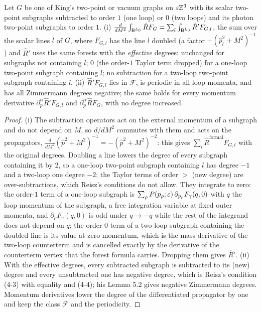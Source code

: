 \begin{lemma}\label{lem:a06:Dp}
Let $G$ be one of King's two-point or vacuum graphs on $\varepsilon\mathbb Z^3$ with its scalar two-point subgraphs subtracted to order $1$ (one loop) or $0$ (two loops) and its photon two-point subgraphs to order $1$. \textup{(i)} $\frac{d}{dM^2}\int_{\mathsf B^{L_0}}\hat RF_G=\sum_{l}\int_{\mathsf B^{L_0}}\hat R'F_{G,l}$, the sum over the scalar lines $l$ of $G$, where $F_{G,l}$ has the line $l$ doubled (a factor $-(\hat p_l^2+M^2)^{-1}$) and $\hat R'$ uses the same forests with the \emph{effective} degrees: unchanged for subgraphs not containing $l$; $0$ (the order-$1$ Taylor term dropped) for a one-loop two-point subgraph containing $l$; no subtraction for a two-loop two-point subgraph containing $l$. \textup{(ii)} $\hat R'F_{G,l}$ lies in $\mathcal F$, is periodic in all loop momenta, and has all Zimmermann degrees negative; the same holds for every momentum derivative $\partial^\alpha_p\hat R'F_{G,l}$ and $\partial^\alpha_p\hat RF_G$, with no degree increased.
\end{lemma}

\begin{proof}
(i) The subtraction operators act on the external momentum of a subgraph and do not depend on $M$, so $d/dM^2$ commutes with them and acts on the propagators, $\frac{d}{dM^2}(\hat p^2+M^2)^{-1}=-(\hat p^2+M^2)^{-2}$: this gives $\sum_l\hat R^{\mathrm{formal}}F_{G,l}$ with the original degrees. Doubling a line lowers the degree of every subgraph containing it by $2$, so a one-loop two-point subgraph containing $l$ has degree $-1$ and a two-loop one degree $-2$; the Taylor terms of order $>$ (new degree) are over-subtractions, which Reisz's conditions do not allow. They integrate to zero: the order-$1$ term of a one-loop subgraph is $\sum_\rho P(p_\rho;\varepsilon)\,\partial_{p_\rho}F_\gamma(q,0)$ with $q$ the loop momentum of the subgraph, a free integration variable at fixed outer momenta, and $\partial_pF_\gamma(q,0)$ is odd under $q\to-q$ while the rest of the integrand does not depend on $q$; the order-$0$ term of a two-loop subgraph containing the doubled line is its value at zero momentum, which is the mass derivative of the two-loop counterterm and is cancelled exactly by the derivative of the counterterm vertex that the forest formula carries. Dropping them gives $\hat R'$. (ii) With the effective degrees, every subtracted subgraph is subtracted to its (new) degree and every unsubtracted one has negative degree, which is Reisz's condition (4-3) with equality and (4-4); his Lemma 5.2 gives negative Zimmermann degrees. Momentum derivatives lower the degree of the differentiated propagator by one and keep the class $\mathcal F$ and the periodicity.
\end{proof}

